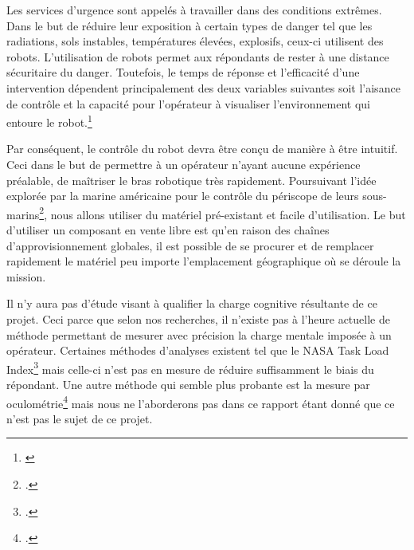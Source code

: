 Les services d'urgence sont appelés à travailler dans des conditions extrêmes. Dans le but de réduire leur exposition à certain types de danger tel que les radiations, sols instables, températures élevées, explosifs, ceux-ci utilisent des robots. L'utilisation de robots permet aux répondants de rester à une distance sécuritaire du danger. Toutefois, le temps de réponse et l'efficacité d'une intervention dépendent principalement des deux variables suivantes soit l'aisance de contrôle et la capacité pour l'opérateur à visualiser l'environnement qui entoure le robot.\footnote{\cite{massey_improved_2009}}

Par conséquent, le contrôle du robot devra être conçu de manière à être intuitif. Ceci dans le but de permettre à un opérateur n'ayant aucune expérience préalable, de maîtriser le bras robotique très rapidement. Poursuivant l'idée explorée par la marine américaine pour le contrôle du périscope de leurs sous-marins\footcite{brock_vergakis_navys_2017}, nous allons utiliser du matériel pré-existant et facile d'utilisation. Le but d'utiliser un composant en vente libre est qu'en raison des chaînes d'approvisionnement globales, il est possible de se procurer et de remplacer rapidement le matériel peu importe l'emplacement géographique où se déroule la mission.

Il n'y aura pas d'étude visant à qualifier la charge cognitive résultante de ce projet. Ceci parce que selon nos recherches, il n'existe pas à l'heure actuelle de méthode permettant de mesurer avec précision la charge mentale imposée à un opérateur. Certaines méthodes d'analyses existent tel que le NASA Task Load Index\footcite{hart_nasa_1986} mais celle-ci n'est pas en mesure de réduire suffisamment le biais du répondant. Une autre méthode qui semble plus probante est la mesure par oculométrie\footcite{st-onges_equipes_robots_2020} mais nous ne l'aborderons pas dans ce rapport étant donné que ce n'est pas le sujet de ce projet.


